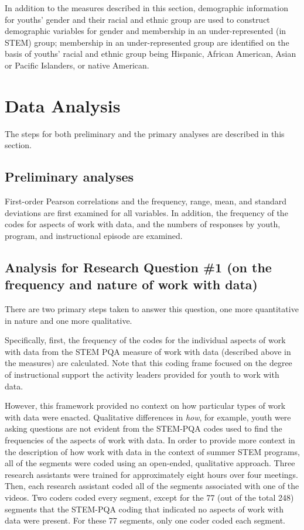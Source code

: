 \documentclass[]{book}
\theoremstyle{definition}
\theoremstyle{definition}
\theoremstyle{definition}
\theoremstyle{remark}
\begin{document}
In addition to the measures described in this section, demographic
information for youths' gender and their racial and ethnic group are
used to construct demographic variables for gender and membership in an
under-represented (in STEM) group; membership in an under-represented
group are identified on the basis of youths' racial and ethnic group
being Hispanic, African American, Asian or Pacific Islanders, or native
American.

\section{Data Analysis}\label{data-analysis}

The steps for both preliminary and the primary analyses are described in
this section.

\subsection{Preliminary analyses}\label{preliminary-analyses}

First-order Pearson correlations and the frequency, range, mean, and
standard deviations are first examined for all variables. In addition,
the frequency of the codes for aspects of work with data, and the
numbers of responses by youth, program, and instructional episode are
examined.

\subsection{Analysis for Research Question \#1 (on the frequency and
nature of work with
data)}\label{analysis-for-research-question-1-on-the-frequency-and-nature-of-work-with-data}

There are two primary steps taken to answer this question, one more
quantitative in nature and one more qualitative.

Specifically, first, the frequency of the codes for the individual
aspects of work with data from the STEM PQA measure of work with data
(described above in the measures) are calculated. Note that this coding
frame focused on the degree of instructional support the activity
leaders provided for youth to work with data.

However, this framework provided no context on how particular types of
work with data were enacted. Qualitative differences in \emph{how}, for
example, youth were asking questions are not evident from the STEM-PQA
codes used to find the frequencies of the aspects of work with data. In
order to provide more context in the description of how work with data
in the context of summer STEM programs, all of the segments were coded
using an open-ended, qualitative approach. Three research assistants
were trained for approximately eight hours over four meetings. Then,
each research assistant coded all of the segments associated with one of
the videos. Two coders coded every segment, except for the 77 (out of
the total 248) segments that the STEM-PQA coding that indicated no
aspects of work with data were present. For these 77 segments, only one
coder coded each segment.
\end{document}

